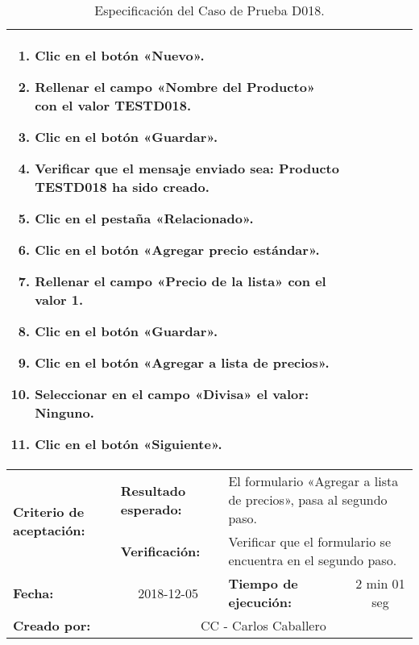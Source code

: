\begin{table}
\begin{tabular}{|p{2.5cm}|p{2.8cm}|p{2.2cm}|p{2.8cm}|p{2.2cm}|}
\multicolumn{4}{p{11.8cm}|}{\footnotesize{
\vspace{-3mm}
\begin{enumerate}
\item Clic en el botón «Nuevo».
\item Rellenar el campo «Nombre del Producto» con el valor \textbf{TESTD018}.
\item Clic en el botón «Guardar».
\item Verificar que el mensaje enviado sea:
    \textbf{Producto TESTD018 ha sido creado}.
\item Clic en el pestaña «Relacionado».
\item Clic en el botón «Agregar precio estándar».
\item Rellenar el campo «Precio de la lista» con el valor \textbf{1}.
\item Clic en el botón «Guardar».
\item Clic en el botón «Agregar a lista de precios».
\item Seleccionar en el campo «Divisa» el valor: \textbf{Ninguno}.
\item Clic en el botón «Siguiente».
\end{enumerate}
\vspace{-5mm}
}} \\
\hline
\multirow{2}{2.8cm}{\footnotesize{\textbf{Criterio de aceptación:}}} &
\footnotesize{\textbf{Resultado esperado:}} &
\multicolumn{3}{p{9.1cm}|}{\footnotesize{El formulario «Agregar a lista de
precios», pasa al segundo paso.}} \\
\cline{2-5}
& \footnotesize{\textbf{Verificación:}} &
\multicolumn{3}{p{9.1cm}|}{\footnotesize{Verificar que el formulario se
encuentra en el segundo paso.}} \\
\hline
\footnotesize{\textbf{Fecha:}} &
\multicolumn{1}{c|}{\footnotesize{2018-12-05}} &
\multicolumn{2}{l|}{\footnotesize{\textbf{Tiempo de ejecución:}}} &
\multicolumn{1}{c|}{\footnotesize{2 min 01 seg}} \\
\hline
\footnotesize{\textbf{Creado por:}} &
\multicolumn{4}{c|}{\footnotesize{CC - Carlos Caballero}} \\
\hline
\end{tabular}
\caption{Especificación del Caso de Prueba D018.}
\label{tcd018}
\end{table}

